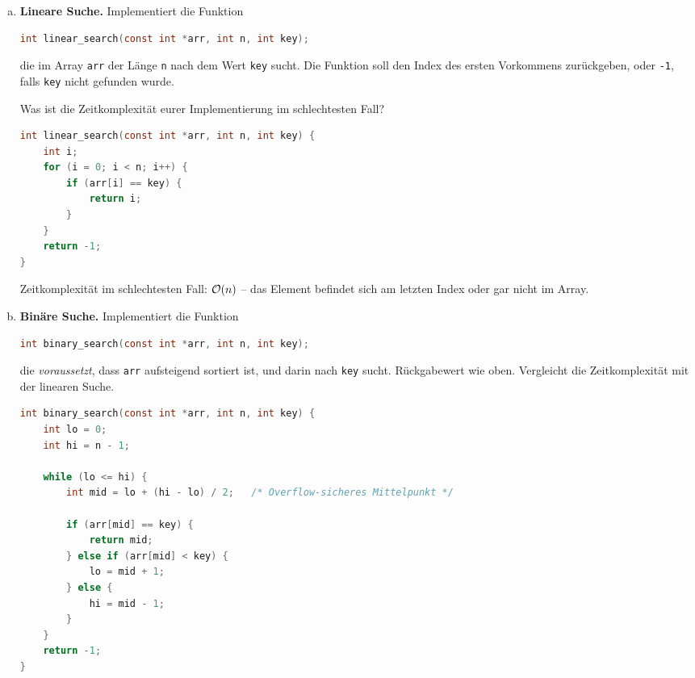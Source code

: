 \begin{enumerate}[a)]

\item \textbf{Lineare Suche.}
Implementiert die Funktion

\begin{lstlisting}[language=C]
int linear_search(const int *arr, int n, int key);
\end{lstlisting}

die im Array \texttt{arr} der Länge \texttt{n} nach dem Wert \texttt{key} sucht.
Die Funktion soll den Index des ersten Vorkommens zurückgeben, oder \texttt{-1},
falls \texttt{key} nicht gefunden wurde.

Was ist die Zeitkomplexität eurer Implementierung im schlechtesten Fall?

\begin{loesung}
\begin{lstlisting}[language=C]
int linear_search(const int *arr, int n, int key) {
    int i;
    for (i = 0; i < n; i++) {
        if (arr[i] == key) {
            return i;
        }
    }
    return -1;
}
\end{lstlisting}

Zeitkomplexität im schlechtesten Fall: $\mathcal{O}(n)$ -- das Element befindet sich am letzten Index oder gar nicht im Array.
\end{loesung}

\item \textbf{Binäre Suche.}
Implementiert die Funktion

\begin{lstlisting}[language=C]
int binary_search(const int *arr, int n, int key);
\end{lstlisting}

die \emph{voraussetzt}, dass \texttt{arr} aufsteigend sortiert ist,
und darin nach \texttt{key} sucht. Rückgabewert wie oben.
Vergleicht die Zeitkomplexität mit der linearen Suche.

\begin{loesung}
\begin{lstlisting}[language=C]
int binary_search(const int *arr, int n, int key) {
    int lo = 0;
    int hi = n - 1;

    while (lo <= hi) {
        int mid = lo + (hi - lo) / 2;   /* Overflow-sicheres Mittelpunkt */

        if (arr[mid] == key) {
            return mid;
        } else if (arr[mid] < key) {
            lo = mid + 1;
        } else {
            hi = mid - 1;
        }
    }
    return -1;
}
\end{lstlisting}


\end{loesung}
\end{enumerate}
